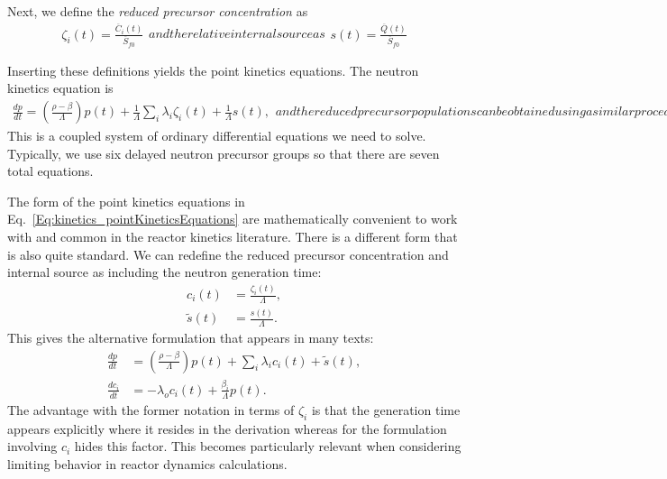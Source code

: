 Next, we define the \emph{reduced precursor concentration} as
\begin{subequations}
\begin{align}
  \zeta_i(t) = \frac{ \overline{C}_i(t) }{ \overline{S}_{f0} } 
\end{align}
and the relative internal source as
\begin{align}
  s(t) = \frac{ \overline{Q}(t) }{ \overline{S}_{f0} } 
\end{align}
\end{subequations}

Inserting these definitions yields the point kinetics equations. The neutron kinetics equation is
\begin{subequations} \label{Eq:kinetics_pointKineticsEquations}
\begin{align}
   \frac{dp}{dt} = \left( \frac{ \rho - \beta }{ \Lambda } \right) p(t) + \frac{1}{\Lambda} \sum_i \lambda_i \zeta_i(t) + \frac{1}{\Lambda} s(t) , \label{Eq:kinetics_pointKineticsEquations_neutrons}
\end{align}
and the reduced precursor populations can be obtained using a similar procedure, giving
\begin{align}
  \frac{d\zeta_i}{dt} = -\lambda_i \zeta_i(t) + \beta_{i} p(t) . \label{Eq:kinetics_pointKineticsEquations_precursors}
\end{align}
\end{subequations}
This is a coupled system of ordinary differential equations we need to solve. Typically, we use six delayed neutron precursor groups so that there are seven total equations.

The form of the point kinetics equations in Eq.~\eqref{Eq:kinetics_pointKineticsEquations} are mathematically convenient to work with and common in the reactor kinetics literature. There is a different form that is also quite standard. We can redefine the reduced precursor concentration and internal source as including the neutron generation time:
\begin{subequations}
\begin{align}
  c_i(t) &= \frac{\zeta_i(t)}{\Lambda}, \\
  \tilde{s}(t) &= \frac{s(t)}{\Lambda}.
\end{align}
\end{subequations}
This gives the alternative formulation that appears in many texts:
\begin{subequations}
\begin{align}
  \frac{dp}{dt} 	&= \left( \frac{ \rho - \beta }{ \Lambda } \right) p(t) + \sum_i \lambda_i c_i(t) + \tilde{s}(t) , \\
  \frac{dc_i}{dt} 	&= -\lambda_o c_i(t) + \frac{\beta_{i}}{\Lambda} p(t) .
\end{align}
\end{subequations}
The advantage with the former notation in terms of $\zeta_i$ is that the generation time appears explicitly where it resides in the derivation whereas for the formulation involving $c_i$ hides this factor. This becomes particularly relevant when considering limiting behavior in reactor dynamics calculations. 

